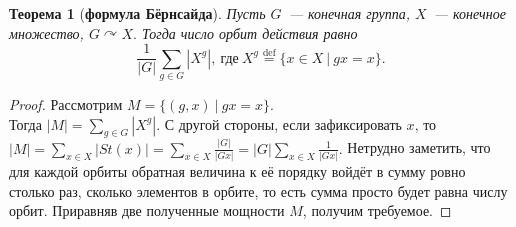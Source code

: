 \documentclass[a4paper, 14pt]{extarticle}
\newcommand{\deq}{\stackrel{\mathrm{def}}{=}}
\theoremstyle{definition}
\theoremstyle{plain}
\newtheorem*{theorem*}{Теорема}
\numberwithin{theorem}{section}
\numberwithin{definition}{section}
\numberwithin{statement}{section}
\numberwithin{lemma}{section}
\numberwithin{consequence}{section}
\begin{document}
        \begin{theorem*}[\textbf{формула Бёрнсайда}]
            Пусть $G$~--- конечная группа, $X$~--- конечное множество, ${G \curvearrowright X.}$ Тогда число орбит действия равно
            \begin{equation*}
                \frac{1}{|G|} \sum_{g \in G} |X^g|, \  \textrm{где} \ X^g \deq \{x \in X \ | \ gx = x\}.
            \end{equation*}
        \end{theorem*}
        \begin{proof}
        	Рассмотрим ${M = \{(g, x) \ | \ gx =x\}.}$ \\ Тогда ${|M| = \displaystyle\sum_{g \in G} |X^g|.}$ С другой стороны, если зафиксировать $x$, то ${|M| = \displaystyle\sum_{x \in X} |St(x)| = \displaystyle\sum_{x \in X} \frac{|G|}{|Gx|} = |G|\displaystyle\sum_{x \in X}\frac{1}{|Gx|}.}$ Нетрудно заметить, что для каждой орбиты обратная величина к её порядку войдёт в сумму ровно столько раз, сколько элементов в орбите, то есть сумма просто будет равна числу орбит. Приравняв две полученные мощности $M$, получим требуемое. \qedhere
        \end{proof}
        \newpage
\end{document}
